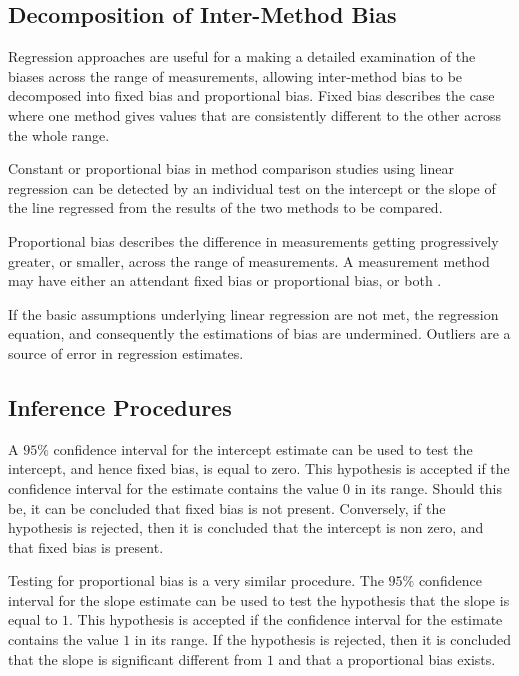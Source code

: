 \documentclass[12pt, a4paper]{report}
\theoremstyle{plain}
\theoremstyle{definition}
\theoremstyle{remark}
\begin{document}
\subsection{Decomposition of Inter-Method Bias}
Regression approaches are useful for a making a detailed examination of the biases across the range of measurements, allowing inter-method bias to be decomposed into fixed bias and proportional bias. Fixed bias describes the case where one method gives values that are consistently different to the other across the whole range. 


Constant or proportional bias in method comparison studies using linear regression can be detected by an individual test on the intercept or the slope of the line regressed from the results of the two methods to be compared.


Proportional bias describes the difference in measurements getting progressively greater, or smaller, across the range of measurements. A measurement method may have either an attendant fixed bias or proportional bias, or both \citep{ludbrook}.

If the basic assumptions underlying linear regression are not met, the regression equation, and consequently the estimations of bias are undermined. Outliers are a source of error in regression estimates.

\subsection{Inference Procedures}
A $95\%$ confidence interval for the intercept estimate can be used to test the intercept, and hence fixed bias, is equal to
zero. This hypothesis is accepted if the confidence interval for the estimate contains the value $0$ in its range. Should this be,
it can be concluded that fixed bias is not present. Conversely, if the hypothesis is rejected, then it is concluded that the
intercept is non zero, and that fixed bias is present.

Testing for proportional bias is a very similar procedure. The $95\%$ confidence interval for the slope estimate can be used to
test the hypothesis that the slope is equal to $1$. This hypothesis is accepted if the confidence interval for the estimate
contains the value $1$ in its range. If the hypothesis is rejected, then it is concluded that the slope is significant
different from $1$ and that a proportional bias exists.
\end{document}
